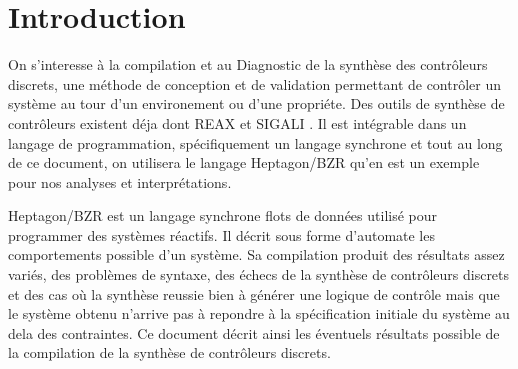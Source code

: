 \documentclass{svjour3}
\begin{document}
\section{Introduction}
\label{intro}
On s'interesse à la compilation et au Diagnostic de la synthèse des contrôleurs discrets, une méthode de conception et de validation permettant de contrôler un système 
au tour d'un environement ou d'une propriéte. Des outils de synthèse de contrôleurs existent déja dont REAX et SIGALI \cite{wodes-Reax} \cite{marchand00c}. Il est intégrable dans un 
langage de programmation, spécifiquement un langage synchrone et tout au long de ce document, on utilisera le langage Heptagon/BZR qu'en est un exemple
pour nos analyses et interprétations.


Heptagon/BZR est un langage synchrone flots de données utilisé pour programmer des systèmes réactifs. Il décrit sous forme d'automate les comportements
possible d'un système. Sa compilation produit des résultats assez variés, des problèmes de syntaxe, des échecs de la synthèse de contrôleurs discrets
et des cas où la synthèse reussie bien à générer une logique de contrôle mais que le système obtenu n'arrive pas à repondre à la spécification initiale du système 
au dela des contraintes. Ce document décrit ainsi les éventuels résultats possible de la compilation de la synthèse de contrôleurs discrets.
\end{document}
